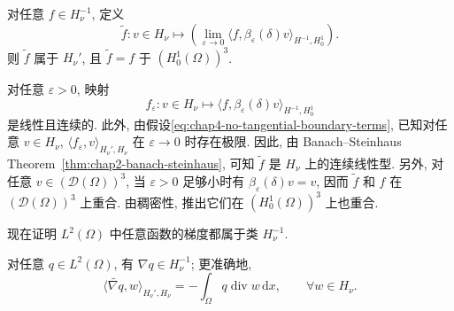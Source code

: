 \begin{Proposition}
\label{prop:chap4-boundary-free-extension}
对任意 $f\in H_\nu^{-1}$, 定义
\[
 \widetilde f:v\in H_\nu\longmapsto
 \left(\lim_{\varepsilon\to0}\langle f,\beta_\varepsilon(\delta)v\rangle_{H^{-1},H_0^1}\right).
\]
则 $\widetilde f$ 属于 $H_\nu'$, 且 $\widetilde f=f$ 于 $(H_0^1(\Omega))^3$.
\end{Proposition}

\begin{Proof}
对任意 $\varepsilon>0$, 映射
\[
 f_\varepsilon:v\in H_\nu\longmapsto
 \langle f,\beta_\varepsilon(\delta)v\rangle_{H^{-1},H_0^1}
\]
是线性且连续的. 此外, 由假设\eqref{eq:chap4-no-tangential-boundary-terms}, 已知对任意 $v\in H_\nu$, $\langle f_\varepsilon,v\rangle_{H_\nu',H_\nu}$ 在 $\varepsilon\to0$ 时存在极限. 因此, 由 Banach--Steinhaus Theorem~\ref{thm:chap2-banach-steinhaus}, 可知 $\widetilde f$ 是 $H_\nu$ 上的连续线性型. 另外, 对任意 $v\in(\mathcal D(\Omega))^3$, 当 $\varepsilon>0$ 足够小时有 $\beta_\varepsilon(\delta)v=v$, 因而 $\widetilde f$ 和 $f$ 在 $(\mathcal D(\Omega))^3$ 上重合. 由稠密性, 推出它们在 $(H_0^1(\Omega))^3$ 上也重合.
\end{Proof}

现在证明 $L^2(\Omega)$ 中任意函数的梯度都属于类 $H_\nu^{-1}$.

\begin{Lemma}
\label{lem:chap4-gradient-no-tangential-boundary-terms}
对任意 $q\in L^2(\Omega)$, 有 $\nabla q\in H_\nu^{-1}$; 更准确地,
\[
 \langle\widetilde{\nabla q},w\rangle_{H_\nu',H_\nu}
 =-\int_\Omega q\operatorname{div}w\,\mathrm dx,
 \qquad\forall w\in H_\nu.
\]
\end{Lemma}

